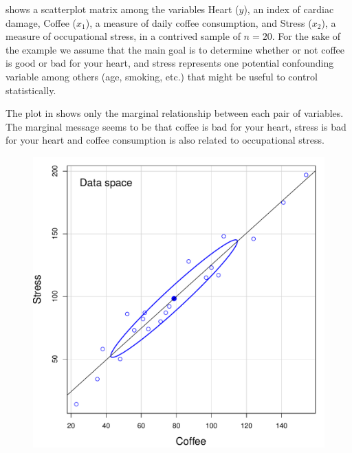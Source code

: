  shows a scatterplot matrix among the variables
Heart ($y$), an index of cardiac damage, Coffee ($x_1$), a measure of daily
coffee consumption, and Stress ($x_2$), a measure of occupational stress, in a contrived
sample of $n=20$. For the sake of the example we assume that the main goal is
to determine whether or not coffee is good or bad for your heart, and stress
represents one potential confounding variable among others (age, smoking, etc.)
that might be useful to control statistically.

The plot in  shows only the marginal relationship
between each pair of variables. The marginal message seems to be that coffee is
bad for your heart, stress is bad for your heart and coffee consumption is
also related to occupational stress.
\begin{figure}[htb]
  \begin{minipage}[c]{.485\textwidth}
   \includegraphics[width=1\linewidth,clip]{fig/vis-reg-coffee12a}
   \end{minipage}%
  \hfill
  \begin{minipage}[c]{.485\textwidth}

\end{minipage}
\end{figure}
